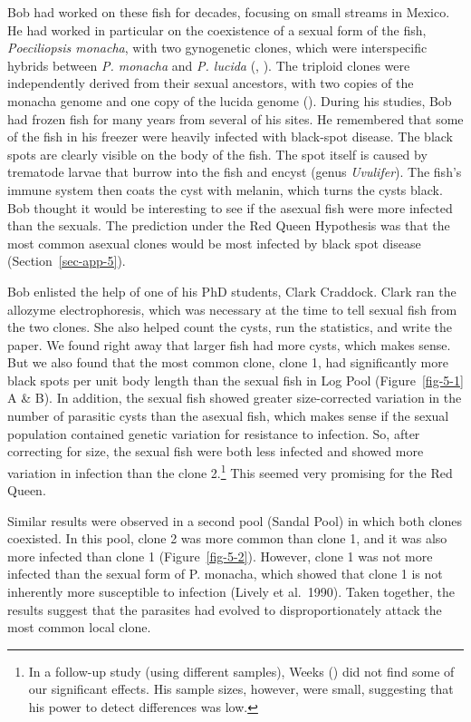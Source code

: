 \documentclass[
  letterpaper,
]{book}
\begin{document}
Bob had worked on these fish for decades, focusing on small streams in
Mexico. He had worked in particular on the coexistence of a sexual form
of the fish, \emph{Poeciliopsis monacha}, with two gynogenetic clones,
which were interspecific hybrids between \emph{P. monacha} and \emph{P.
lucida} (,
). The triploid clones were
independently derived from their sexual ancestors, with two copies of
the monacha genome and one copy of the lucida genome
(). During his studies, Bob had
frozen fish for many years from several of his sites. He remembered that
some of the fish in his freezer were heavily infected with black-spot
disease. The black spots are clearly visible on the body of the fish.
The spot itself is caused by trematode larvae that burrow into the fish
and encyst (genus \emph{Uvulifer}). The fish's immune system then coats
the cyst with melanin, which turns the cysts black. Bob thought it would
be interesting to see if the asexual fish were more infected than the
sexuals. The prediction under the Red Queen Hypothesis was that the most
common asexual clones would be most infected by black spot disease
(Section~\ref{sec-app-5}).

Bob enlisted the help of one of his PhD students, Clark Craddock. Clark
ran the allozyme electrophoresis, which was necessary at the time to
tell sexual fish from the two clones. She also helped count the cysts,
run the statistics, and write the paper. We found right away that larger
fish had more cysts, which makes sense. But we also found that the most
common clone, clone 1, had significantly more black spots per unit body
length than the sexual fish in Log Pool (Figure~\ref{fig-5-1} A \& B).
In addition, the sexual fish showed greater size-corrected variation in
the number of parasitic cysts than the asexual fish, which makes sense
if the sexual population contained genetic variation for resistance to
infection. So, after correcting for size, the sexual fish were both less
infected and showed more variation in infection than the clone
2.\footnote{In a follow-up study (using different samples), Weeks
  () did not find some of our significant
  effects. His sample sizes, however, were small, suggesting that his
  power to detect differences was low.} This seemed very promising for
the Red Queen.

Similar results were observed in a second pool (Sandal Pool) in which
both clones coexisted. In this pool, clone 2 was more common than clone
1, and it was also more infected than clone 1 (Figure~\ref{fig-5-2}).
However, clone 1 was not more infected than the sexual form of P.
monacha, which showed that clone 1 is not inherently more susceptible to
infection (Lively et al.~1990). Taken together, the results suggest that
the parasites had evolved to disproportionately attack the most common
local clone.
\end{document}
